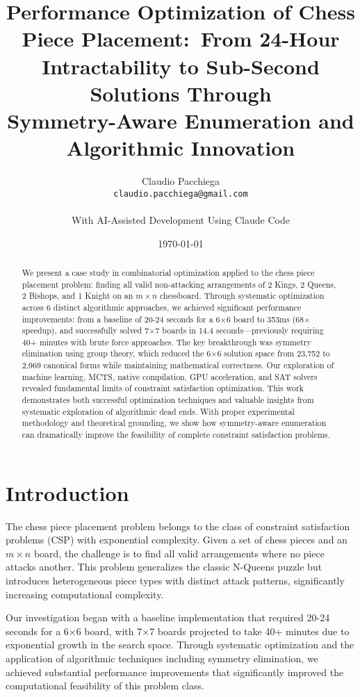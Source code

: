 \documentclass[12pt,a4paper]{article}
\title{Performance Optimization of Chess Piece Placement:\
From 24-Hour Intractability to Sub-Second Solutions Through\\
Symmetry-Aware Enumeration and Algorithmic Innovation}
\author{Claudio Pacchiega\\
\texttt{claudio.pacchiega@gmail.com}\\
\\
\small{With AI-Assisted Development Using Claude Code}}
\date{\today}
\theoremstyle{definition}
\begin{document}
\maketitle

\begin{abstract}
We present a case study in combinatorial optimization applied to the chess piece placement problem: finding all valid non-attacking arrangements of 2 Kings, 2 Queens, 2 Bishops, and 1 Knight on an $m \times n$ chessboard. Through systematic optimization across 6 distinct algorithmic approaches, we achieved significant performance improvements: from a baseline of 20-24 seconds for a 6$\times$6 board to 353ms (68$\times$ speedup), and successfully solved 7$\times$7 boards in 14.4 seconds—previously requiring 40+ minutes with brute force approaches. The key breakthrough was symmetry elimination using group theory, which reduced the 6$\times$6 solution space from 23,752 to 2,969 canonical forms while maintaining mathematical correctness. Our exploration of machine learning, MCTS, native compilation, GPU acceleration, and SAT solvers revealed fundamental limits of constraint satisfaction optimization. This work demonstrates both successful optimization techniques and valuable insights from systematic exploration of algorithmic dead ends. With proper experimental methodology and theoretical grounding, we show how symmetry-aware enumeration can dramatically improve the feasibility of complete constraint satisfaction problems.
\end{abstract}

\section{Introduction}

The chess piece placement problem belongs to the class of constraint satisfaction problems (CSP) with exponential complexity. Given a set of chess pieces and an $m \times n$ board, the challenge is to find all valid arrangements where no piece attacks another. This problem generalizes the classic N-Queens puzzle but introduces heterogeneous piece types with distinct attack patterns, significantly increasing computational complexity.

Our investigation began with a baseline implementation that required 20-24 seconds for a 6$\times$6 board, with 7$\times$7 boards projected to take 40+ minutes due to exponential growth in the search space. Through systematic optimization and the application of algorithmic techniques including symmetry elimination, we achieved substantial performance improvements that significantly improved the computational feasibility of this problem class.
\end{document}
